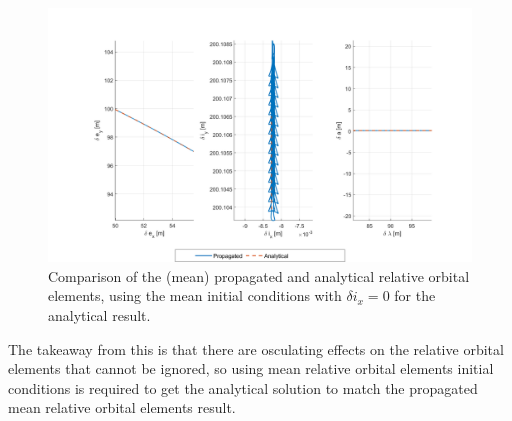 \begin{figure}[htpb]
    \centering
    \includegraphics[width=0.8\linewidth]{sim/figures/PS4/ROE_analytical_compare_mean_IC3_SV2.png}
    \caption{Comparison of the (mean) propagated and analytical relative orbital elements, using the mean initial conditions with $\delta i_x = 0$ for the analytical result.}
\label{fig:roe_analytical_compare_mean_zeroed}
\end{figure}


The takeaway from this is that there are osculating effects on the relative orbital elements that cannot be ignored, so using mean relative orbital elements initial conditions is required to get the analytical solution to match the propagated mean relative orbital elements result.